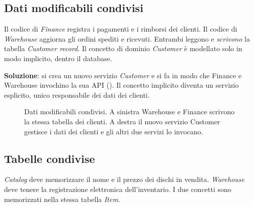 \subsection{Dati modificabili condivisi}
\label{sec:split-mutabili}

Il codice di \emph{Finance} registra i pagamenti e i rimborsi dei clienti. Il codice di \emph{Warehouse} aggiorna gli
ordini spediti e ricevuti. Entrambi leggono e \emph{scrivono} la tabella \emph{Customer record}. Il concetto di
dominio \emph{Customer} è modellato solo in modo implicito, dentro il database.

\textbf{Soluzione}: si crea un nuovo servizio \emph{Customer} e si fa in modo che Finance e Warehouse invochino la sua
API (). Il concetto implicito diventa un servizio esplicito, unico responsabile dei dati
dei clienti.

\begin{figure}[ht]
\centering
{}
\caption{Dati modificabili condivisi. A sinistra Warehouse e Finance scrivono la stessa tabella dei clienti. A destra il
nuovo servizio Customer gestisce i dati dei clienti e gli altri due servizi lo invocano.}
\label{fig:split-mutabili}
\end{figure}

\subsection{Tabelle condivise}
\label{sec:split-tabelle}

\emph{Catalog} deve memorizzare il nome e il prezzo dei dischi in vendita. \emph{Warehouse} deve tenere la registrazione
elettronica dell'inventario. I due concetti sono memorizzati nella stessa tabella \emph{Item}.

